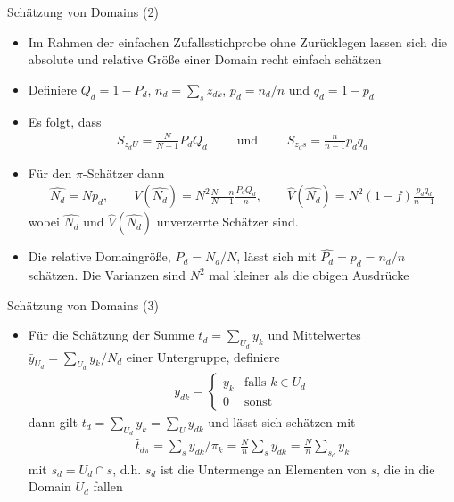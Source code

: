 \documentclass[9pt]{beamer}
\begin{document}
\begin{frame}{Schätzung von Domains (2)}
\begin{itemize}
\item Im Rahmen der einfachen Zufallsstichprobe ohne Zurücklegen lassen sich die absolute und relative Größe einer Domain recht einfach schätzen
\item Definiere $Q_d = 1-P_d$, $n_d = \sum_s z_{dk}$, $p_d = n_d/n$ und $q_d=1-p_d$
\item Es folgt, dass
\begin{align*}
S_{z_d U} = \frac{N}{N-1} P_d Q_d \qquad \text{ und } \qquad	S_{z_d s} = \frac{n}{n-1} p_d q_d
\end{align*}
\item Für den $\pi$-Schätzer dann
\begin{align*}
\hat{N_d} = N p_d, \qquad V(\hat{N_d}) = N^2 \frac{N-n}{N-1} \frac{P_dQ_d}{n}, \qquad \hat{V}(\hat{N_d}) = N^2 (1-f) \frac{p_d q_d}{n-1}
\end{align*}
wobei $\hat{N_d}$ und $ \hat{V}(\hat{N_d})$ unverzerrte Schätzer sind.
\item Die relative Domaingröße, $P_d=N_d/N$, lässt sich mit $\hat{P_d}=p_d = n_d/n$ schätzen. Die Varianzen sind $N^2$ mal kleiner als die obigen Ausdrücke
\end{itemize}
\end{frame}

\begin{frame}{Schätzung von Domains (3)}
\begin{itemize}
\item Für die Schätzung der Summe $t_d = \sum_{U_d} y_k$ und Mittelwertes $\bar{y}_{U_d}= \sum_{U_d} y_k/N_d$ einer Untergruppe, definiere
\begin{align*}
y_{dk}= \begin{cases}
y_k & \text{falls } k \in U_d\\
0 & \text{sonst}
\end{cases}
\end{align*}
dann gilt $t_d = \sum_{U_d} y_k = \sum_U y_{dk}$ und lässt sich schätzen mit
\begin{align*}
\hat{t}_{d\pi} = \sum_s y_{dk}/\pi_k = \frac{N}{n} \sum_s y_{dk} = \frac{N}{n}\sum_{s_d}y_k
\end{align*}
mit $s_d = U_d \cap s$, d.h. $s_d$ ist die Untermenge an Elementen von $s$, die in die Domain $U_d$ fallen
\end{itemize}
\end{frame}
\end{document}
